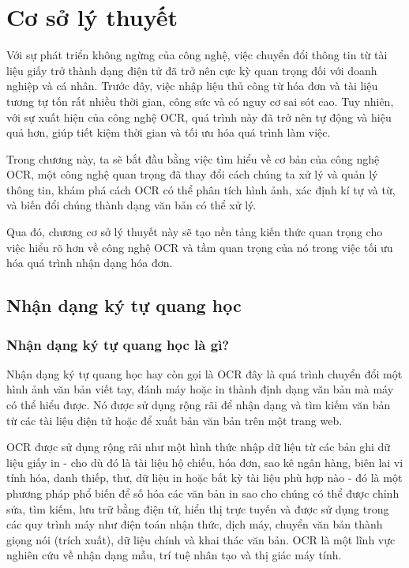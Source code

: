 \section{Cơ sở lý thuyết}
Với sự phát triển không ngừng của công nghệ, việc chuyển đổi thông tin từ tài liệu giấy trở thành dạng điện tử đã trở nên cực kỳ quan trọng đối với doanh nghiệp và cá nhân. Trước đây, việc nhập liệu thủ công từ hóa đơn và tài liệu tương tự tốn rất nhiều thời gian, công sức và có nguy cơ sai sót cao. Tuy nhiên, với sự xuất hiện của công nghệ OCR, quá trình này đã trở nên tự động và hiệu quả hơn, giúp tiết kiệm thời gian và tối ưu hóa quá trình làm việc.

Trong chương này, ta sẽ bắt đầu bằng việc tìm hiểu về cơ bản của công nghệ OCR, một công nghệ quan trọng đã thay đổi cách chúng ta xử lý và quản lý thông tin, khám phá cách OCR có thể phân tích hình ảnh, xác định kí tự và từ, và biến đổi chúng thành dạng văn bản có thể xử lý.

Qua đó, chương cơ sở lý thuyết này sẽ tạo nền tảng kiến thức quan trọng cho việc hiểu rõ hơn về công nghệ OCR và tầm quan trọng của nó trong việc tối ưu hóa quá trình nhận dạng hóa đơn.

\subsection{Nhận dạng ký tự quang học}
\subsubsection{Nhận dạng ký tự quang học là gì?}
Nhận dạng ký tự quang học hay còn gọi là OCR đây là quá trình chuyển đổi một hình ảnh văn bản viết tay, đánh máy hoặc in thành định dạng văn bản mà máy có thể hiểu được. Nó được sử dụng rộng rãi để nhận dạng và tìm kiếm văn bản từ các tài liệu điện tử hoặc để xuất bản văn bản trên một trang web. \cite{aws, survey_ocr_Applications}

OCR được sử dụng rộng rãi như một hình thức nhập dữ liệu từ các bản ghi dữ liệu giấy in - cho dù đó là tài liệu hộ chiếu, hóa đơn, sao kê ngân hàng, biên lai vi tính hóa, danh thiếp, thư, dữ liệu in hoặc bất kỳ tài liệu phù hợp nào - đó là một phương pháp phổ biến để số hóa các văn bản in sao cho chúng có thể được chỉnh sửa, tìm kiếm, lưu trữ bằng điện tử, hiển thị trực tuyến và được sử dụng trong các quy trình máy như điện toán nhận thức, dịch máy, chuyển văn bản thành giọng nói (trích xuất), dữ liệu chính và khai thác văn bản. OCR là một lĩnh vực nghiên cứu về nhận dạng mẫu, trí tuệ nhân tạo và thị giác máy tính.\cite{wiki}

